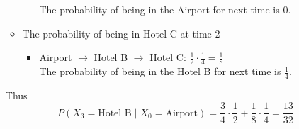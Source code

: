 \documentclass[12pt]{article}
\begin{document}
\begin{enumerate}[label=(\alph*)]
\begin{itemize}
\begin{itemize}
                The probability of being in the Airport for next time is 0.\\
            \end{itemize}
        \item The probability of being in Hotel C at time 2\\
        

            \begin{itemize}
                \item Airport $\rightarrow$ Hotel B $\rightarrow$ Hotel C: $\frac{1}{2} \cdot \frac{1}{4} = \frac{1}{8}$ \\
                
                The probability of being in the Hotel B for next time is $\frac{1}{4}$.\\
            \end{itemize}
    \end{itemize}
    
    Thus $$P(X_3 = \text{Hotel B}\;|\;X_0 = \text{Airport}) = \frac{3}{4} \cdot \frac{1}{2} + \frac{1}{8} \cdot \frac{1}{4} = \frac{13}{32}$$
\end{enumerate}
\end{document}
